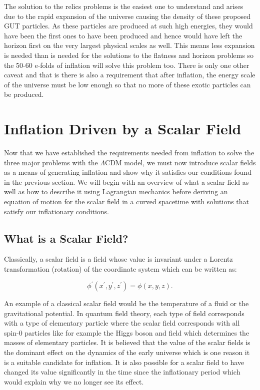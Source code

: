 \documentclass[a4paper,12pt,twoside]{report}
\begin{document}
The solution to the relics problems is the easiest one to understand and arises due to the rapid expansion of the universe causing the density of these proposed GUT particles. As these particles are produced at such high energies, they would have been the first ones to have been produced and hence would have left the horizon first on the very largest physical scales as well. This means less expansion is needed than is needed for the solutions to the flatness and horizon problems so the 50-60 e-folds of inflation will solve this problem too. There is only one other caveat and that is there is also a requirement that after inflation, the energy scale of the universe must be low enough so that no more of these exotic particles can be produced.

\section{Inflation Driven by a Scalar Field} \label{sec:InflatScalFields}

Now that we have established the requirements needed from inflation to solve the three major problems with the $\Lambda$CDM model, we must now introduce scalar fields as a means of generating inflation and show why it satisfies our conditions found in the previous section. We will begin with an overview of what a scalar field as well as how to describe it using Lagrangian mechanics before deriving an equation of motion for the scalar field in a curved spacetime with solutions that satisfy our inflationary conditions. 

\subsection{What is a Scalar Field?}

Classically, a scalar field is a field whose value is invariant under a Lorentz transformation (rotation) of the coordinate system which can be written as:

\begin{equation}
\phi^{\prime}\left(x^{\prime}, y^{\prime}, z^{\prime} \right) = \phi \left(x, y, z \right). \label{eq2.9}
\end{equation}

An example of a classical scalar field would be the temperature of a fluid or the gravitational potential. In quantum field theory, each type of field corresponds with a type of elementary particle where the scalar field corresponds with all spin-0 particles like for example the Higgs boson and field which determines the masses of elementary particles. It is believed that the value of the scalar fields is the dominant effect on the dynamics of the early universe which is one reason it is a suitable candidate for inflation. It is also possible for a scalar field to have changed its value significantly in the time since the inflationary period which would explain why we no longer see its effect. 
\end{document}
